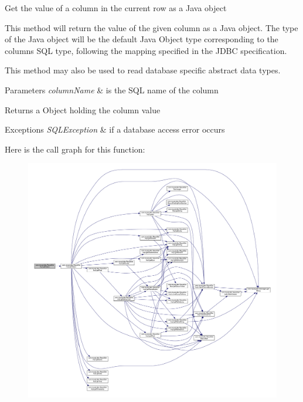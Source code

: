 Get the value of a column in the current row as a Java object

This method will return the value of the given column as a Java object. The type of the Java object will be the default Java Object type corresponding to the column\textquotesingle{}s S\+QL type, following the mapping specified in the J\+D\+BC specification. 

This method may also be used to read database specific abstract data types. 


\begin{DoxyParams}{Parameters}
{\em column\+Name} & is the S\+QL name of the column\\
\hline
\end{DoxyParams}
\begin{DoxyReturn}{Returns}
a Object holding the column value
\end{DoxyReturn}

\begin{DoxyExceptions}{Exceptions}
{\em S\+Q\+L\+Exception} & if a database access error occurs \\
\hline
\end{DoxyExceptions}
Here is the call graph for this function\+:
\nopagebreak
\begin{figure}[H]
\begin{center}
\leavevmode
\includegraphics[width=350pt]{classcom_1_1mysql_1_1jdbc_1_1_result_set_impl_a1880c60be672be45187ea22e8b63768b_cgraph}
\end{center}
\end{figure}
\mbox{\label{classcom_1_1mysql_1_1jdbc_1_1_result_set_impl_a4817a6b6b87b9639afd00209f1c6fac5}} 
